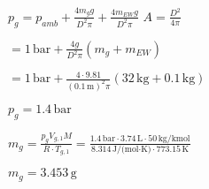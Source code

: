 \( p_g = p_{amb} + \frac{4 m_g g}{D^2 \pi} + \frac{4 m_{EW} g}{D^2 \pi} \)  
\( A = \frac{D^2}{4 \pi} \)  

\( = 1 \, \text{bar} + \frac{4 g}{D^2 \pi} (m_g + m_{EW}) \)  

\( = 1 \, \text{bar} + \frac{4 \cdot 9.81}{(0.1 \, \text{m})^2 \pi} (32 \, \text{kg} + 0.1 \, \text{kg}) \)  

\( p_g = 1.4 \, \text{bar} \)  

\( m_g = \frac{p_g V_{g,1} M}{R \cdot T_{g,1}} = \frac{1.4 \, \text{bar} \cdot 3.74 \, \text{L} \cdot 50 \, \text{kg/kmol}}{8.314 \, \text{J/(mol·K)} \cdot 773.15 \, \text{K}} \)  

\( m_g = 3.453 \, \text{g} \)